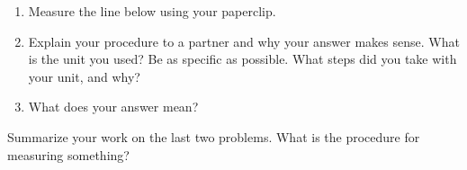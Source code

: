 \documentclass[nooutcomes,noauthor]{ximera}
\begin{document}
\begin{problem}
\begin{enumerate}
\item Measure the line below using your paperclip. 
\item Explain your procedure to a partner and why your answer makes sense. What is the unit you used? Be as specific as possible. What steps did you take with your unit, and why?
\item What does your answer mean?
\end{enumerate}
\begin{center}
\end{center}
%
\end{problem}
\vfill 
\begin{problem}
Summarize your work on the last two problems. What is the procedure for measuring something?
\end{problem}
\end{document}
